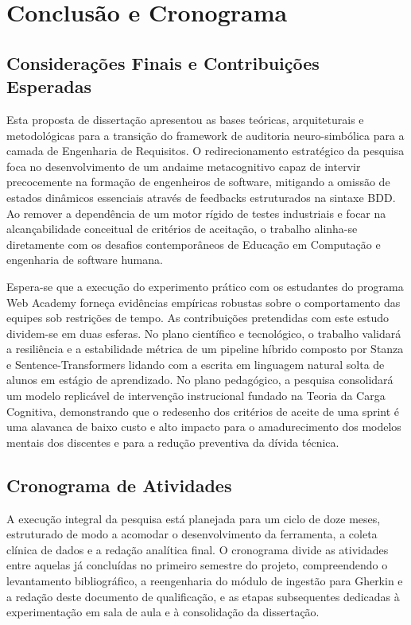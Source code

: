 \documentclass[ruledheader]{abnt_UFF}[abntex2]
\begin{document}
\chapter{Conclusão e Cronograma}

\section{Considerações Finais e Contribuições Esperadas}

Esta proposta de dissertação apresentou as bases teóricas, arquiteturais e metodológicas para a transição do framework de auditoria neuro-simbólica para a camada de Engenharia de Requisitos. O redirecionamento estratégico da pesquisa foca no desenvolvimento de um andaime metacognitivo capaz de intervir precocemente na formação de engenheiros de software, mitigando a omissão de estados dinâmicos essenciais através de feedbacks estruturados na sintaxe BDD. Ao remover a dependência de um motor rígido de testes industriais e focar na alcançabilidade conceitual de critérios de aceitação, o trabalho alinha-se diretamente com os desafios contemporâneos de Educação em Computação e engenharia de software humana.

Espera-se que a execução do experimento prático com os estudantes do programa Web Academy forneça evidências empíricas robustas sobre o comportamento das equipes sob restrições de tempo. As contribuições pretendidas com este estudo dividem-se em duas esferas. No plano científico e tecnológico, o trabalho validará a resiliência e a estabilidade métrica de um pipeline híbrido composto por Stanza e Sentence-Transformers lidando com a escrita em linguagem natural solta de alunos em estágio de aprendizado. No plano pedagógico, a pesquisa consolidará um modelo replicável de intervenção instrucional fundado na Teoria da Carga Cognitiva, demonstrando que o redesenho dos critérios de aceite de uma sprint é uma alavanca de baixo custo e alto impacto para o amadurecimento dos modelos mentais dos discentes e para a redução preventiva da dívida técnica.

\section{Cronograma de Atividades}

A execução integral da pesquisa está planejada para um ciclo de doze meses, estruturado de modo a acomodar o desenvolvimento da ferramenta, a coleta clínica de dados e a redação analítica final. O cronograma divide as atividades entre aquelas já concluídas no primeiro semestre do projeto, compreendendo o levantamento bibliográfico, a reengenharia do módulo de ingestão para Gherkin e a redação deste documento de qualificação, e as etapas subsequentes dedicadas à experimentação em sala de aula e à consolidação da dissertação.
\end{document}

